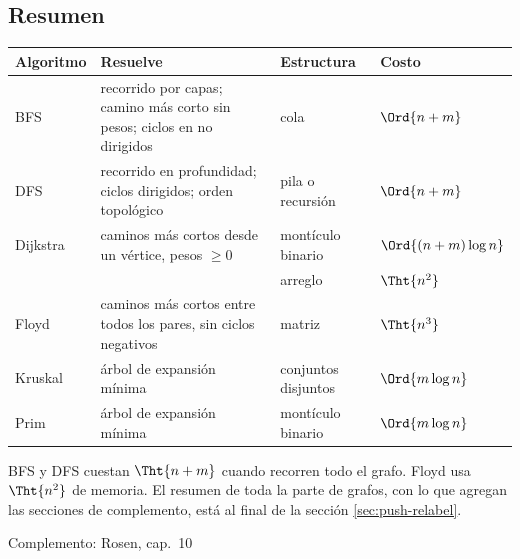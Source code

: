 \documentclass[11pt,letterpaper]{article}
\begin{document}

\subsection*{Resumen}

\begin{center}
\small
\begin{tabular}{l>{\raggedright\arraybackslash}p{4.4cm}%
                 >{\raggedright\arraybackslash}p{3.2cm}l}
  \toprule
  \textbf{Algoritmo} & \textbf{Resuelve} & \textbf{Estructura}
    & \textbf{Costo} \\
  \midrule
  BFS & recorrido por capas; camino más corto sin pesos; ciclos en no
        dirigidos & cola & $\Ord{n + m}$ \\
  \addlinespace
  DFS & recorrido en profundidad; ciclos dirigidos; orden topológico
      & pila o recursión & $\Ord{n + m}$ \\
  \addlinespace
  Dijkstra & caminos más cortos desde un vértice, pesos $\geq 0$
           & montículo binario & $\Ord{(n + m) \log n}$ \\
           & & arreglo & $\Tht{n^2}$ \\
  \addlinespace
  Floyd & caminos más cortos entre todos los pares, sin ciclos
          negativos & matriz & $\Tht{n^3}$ \\
  \addlinespace
  Kruskal & árbol de expansión mínima & conjuntos disjuntos
          & $\Ord{m \log n}$ \\
  \addlinespace
  Prim & árbol de expansión mínima & montículo binario
       & $\Ord{m \log n}$ \\
  \bottomrule
\end{tabular}
\end{center}

BFS y DFS cuestan $\Tht{n + m}$ cuando recorren todo el grafo. Floyd
usa $\Tht{n^2}$ de memoria. El resumen de toda la parte de grafos, con
lo que agregan las secciones de complemento, está al final de la
sección \ref{sec:push-relabel}.

\newpage


%
  {Complemento: Rosen, cap.\ 10}
\label{sec:teoria-grafos}
\end{document}
